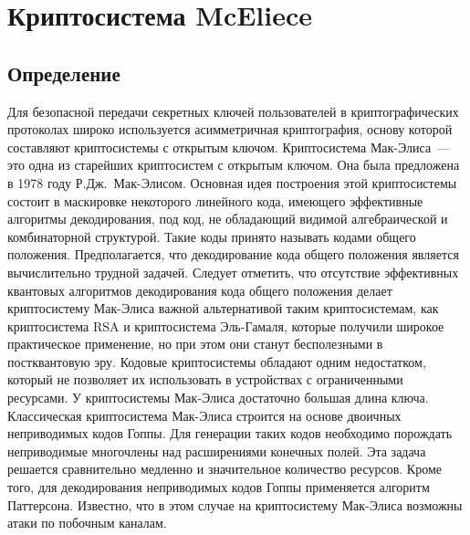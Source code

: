 \documentclass[12pt]{article}
\begin{document}
\newpage

\section{Криптосистема McEliece}



\subsection{Определение}

Для безопасной передачи секретных ключей пользователей в криптографических протоколах широко используется асимметричная криптография, основу которой составляют криптосистемы с открытым ключом. Криптосистема Мак-Элиса~--- это одна из старейших криптосистем с открытым ключом. Она была предложена в 1978 году Р.Дж.~Мак-Элисом. Основная идея построения этой криптосистемы состоит в маскировке некоторого линейного кода, имеющего эффективные алгоритмы декодирования, под код, не обладающий видимой алгебраической и комбинаторной структурой. Такие коды принято называть кодами общего положения. Предполагается, что декодирование кода общего положения является вычислительно трудной задачей. Следует отметить, что отсутствие эффективных квантовых алгоритмов декодирования кода общего положения делает криптосистему Мак-Элиса важной альтернативой таким криптосистемам, как криптосистема RSA и криптосистема Эль-Гамаля, которые получили широкое практическое применение, но при этом они станут бесполезными в постквантовую эру. Кодовые криптосистемы обладают одним недостатком, который не позволяет их использовать в устройствах с ограниченными ресурсами. У криптосистемы Мак-Элиса достаточно большая длина ключа. Классическая криптосистема Мак-Элиса строится на основе двоичных неприводимых кодов Гоппы. Для генерации таких кодов необходимо порождать неприводимые многочлены над расширениями конечных полей. Эта задача решается сравнительно медленно и значительное количество ресурсов. Кроме того, для декодирования неприводимых кодов Гоппы применяется алгоритм Паттерсона. Известно, что в этом случае на криптосистему Мак-Элиса возможны атаки по побочным каналам. 
\end{document}
